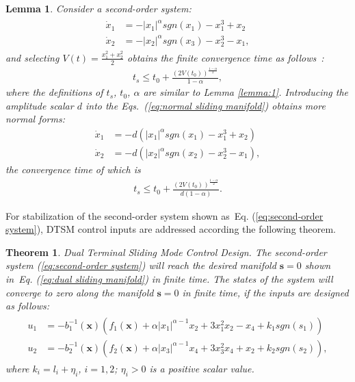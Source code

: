 \documentclass[3p]{elsarticle}
\theoremstyle{plain}
\newtheorem{mylem}{Lemma}
\newtheorem{mythm}{Theorem}
\theoremstyle{remark}
\begin{document}
\begin{mylem}
Consider a second-order system:
\begin{align}
\begin{split}
\dot x_1&=-\vert x_1\vert^\alpha sgn(x_1)-x_1^3+x_2\\
\dot x_2&=-\vert x_2\vert^\alpha sgn(x_3)-x_2^3-x_1,\label{eq:normal sliding manifold}
\end{split}
\end{align}
and selecting $V(t) = \frac{x_1^2+x_2^2}{2}$ obtains the finite convergence time as follows~\cite{moulay2006finite}:
\begin{align}
t_s\le t_0+\frac{(2V(t_0))^{\frac{1-\alpha}{2}}}{1-\alpha},
\end{align}
where the definitions of  $t_s$, $t_0$, $\alpha$ are similar to Lemma \ref{lemma:1}. Introducing the amplitude scalar $d$ into the Eqs.~(\ref{eq:normal sliding manifold}) obtains  more normal forms:
\begin{align}
\dot x_1&=-d(\vert x_1\vert^\alpha sgn(x_1)-x_1^3+x_2)\\
\dot x_2&=-d(\vert x_2\vert^\alpha sgn(x_2)-x_2^3-x_1),\label{eq:more normal sliding manifold}
\end{align}
the convergence time of which is
\begin{align}
t_s\le t_0+\frac{(2V(t_0))^{\frac{1-\alpha}{2}}}{d(1-\alpha)}.
\end{align}\label{lemma:2}
\end{mylem}
For stabilization of the second-order system shown as~Eq. (\ref{eq:second-order system}), DTSM control inputs are addressed according the following theorem.
\begin{mythm}\label{theorem:1}Dual Terminal Sliding Mode Control Design.
The second-order system (\ref{eq:second-order system}) will reach the desired manifold $\bm s = 0$ shown in~Eq. (\ref{eq:dual sliding manifold}) in finite time. The states of the system will converge to zero along the manifold $\bm s=0$ in finite time, if the inputs are designed as follows:
\begin{align}
\begin{split}
u_1 &= -b_1^{-1}(\bm x)(f_1(\bm x)+\alpha\vert x_1\vert^{\alpha-1}x_2+3x_1^2x_2-x_4+k_1sgn(s_1))\\
u_2 &= -b_2^{-1}(\bm x)(f_2(\bm x)+\alpha\vert x_3\vert^{\alpha-1}x_4+3x_3^2x_4+x_2+k_2sgn(s_2)),\label{eq:DSM input}
\end{split}
\end{align}
where $k_i = l_i+\eta_i$, $i=1,2$; $\eta_i>0$ is a positive scalar value.
\end{mythm}
\end{document}
